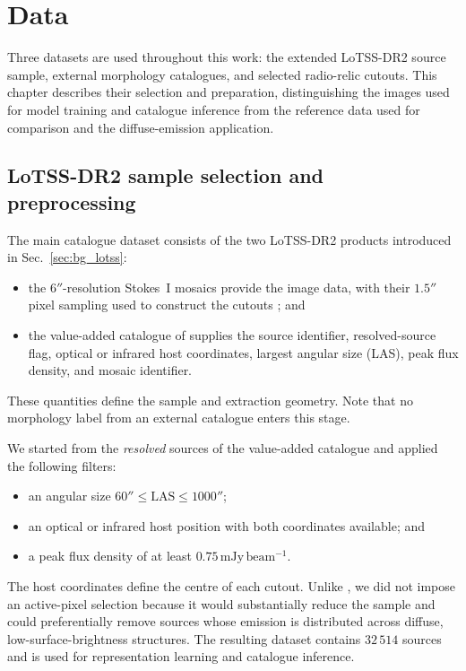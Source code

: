 \section{Data}
\label{sec:data}

Three datasets are used throughout this work: the extended LoTSS-DR2 source sample, external morphology catalogues, and selected radio-relic cutouts. This chapter describes their selection and preparation, distinguishing the images used for model training and catalogue inference from the reference data used for comparison and the diffuse-emission application.

\subsection{LoTSS-DR2 sample selection and preprocessing}
\label{sec:data_catalogue}

The main catalogue dataset consists of the two LoTSS-DR2 products introduced in Sec.~\ref{sec:bg_lotss}:
\begin{itemize}
\item the \(6''\)-resolution Stokes~I mosaics provide the image data, with their \(1.5''\) pixel sampling used to construct the cutouts \citep{Shimwell2022}; and
\item the value-added catalogue of \citet{Hardcastle2023} supplies the source identifier, resolved-source flag, optical or infrared host coordinates, largest angular size (LAS), peak flux density, and mosaic identifier.
\end{itemize}
These quantities define the sample and extraction geometry. Note that no morphology label from an external catalogue enters this stage.

We started from the \textit{resolved} sources of the value-added catalogue and applied the following filters:
\begin{itemize}
\item an angular size \(60'' \leq \mathrm{LAS} \leq 1000''\);
\item an optical or infrared host position with both coordinates available; and
\item a peak flux density of at least \(0.75\,\mathrm{mJy\,beam^{-1}}\).
\end{itemize}
The host coordinates define the centre of each cutout. Unlike \citet{Nicolas2025}, we did not impose an active-pixel selection because it would substantially reduce the sample and could preferentially remove sources whose emission is distributed across diffuse, low-surface-brightness structures. The resulting dataset contains \(32\,514\) sources and is used for representation learning and catalogue inference.

